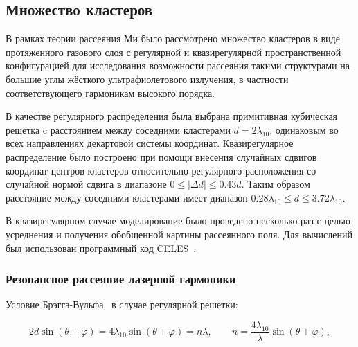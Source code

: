 \subsection{Множество кластеров}

В рамках теории рассеяния Ми было рассмотрено множество кластеров в виде протяженного газового слоя с регулярной и квазирегулярной пространственной конфигурацией для исследования возможности рассеяния такими структурами на большие углы жёсткого ультрафиолетового излучения, в частности соответствующего гармоникам высокого порядка.

В качестве регулярного распределения была выбрана примитивная кубическая решетка c расстоянием между соседними кластерами $d = 2\lambda_{10}$, одинаковым во всех направлениях декартовой системы координат. Квазирегулярное распределение было построено при помощи внесения случайных сдвигов координат центров кластеров относительно регулярного расположения со случайной нормой сдвига в диапазоне $0 \leq |\Delta d| \leq 0.43d$. Таким образом расстояние между соседними кластерами имеет диапазон $0.28\lambda_{10} \le d \le 3.72\lambda_{10}$.

В квазирегулярном случае моделирование было проведено несколько раз с целью усреднения и получения обобщенной картины рассеянного поля. Для вычислений был использован программный код CELES~\cite{celes}.

\subsubsection{Резонансное рассеяние лазерной гармоники}


Условие Брэгга-Вульфа~\cite{boren_huffman} в случае регулярной решетки:

    \begin{equation}
        2 d \sin(\theta+\varphi) = 4 \lambda_{10} \sin(\theta+\varphi) = n \lambda, \qquad n = \frac{4 \lambda_{10}}{\lambda} \sin(\theta+\varphi),
        \label{bragg_wolf_order}
    \end{equation}

